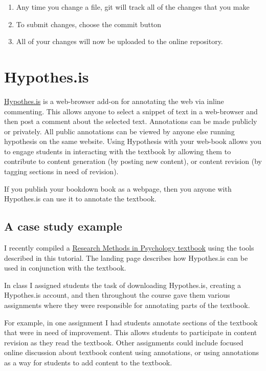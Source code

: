 \documentclass[
]{book}
\providecommand{\tightlist}{%
  \setlength{\itemsep}{0pt}\setlength{\parskip}{0pt}}
\begin{document}
\begin{enumerate}
\def\labelenumi{\arabic{enumi}.}
\tightlist
\item
  Any time you change a file, git will track all of the changes that you make
\item
  To submit changes, choose the commit button
\item
  All of your changes will now be uploaded to the online repository.
\end{enumerate}

\hypertarget{hypothes.is}{%
\chapter{Hypothes.is}\label{hypothes.is}}

\href{https://web.hypothes.is}{Hypothes.is} is a web-browser add-on for annotating the web via inline commenting. This allows anyone to select a snippet of text in a web-browser and then post a comment about the selected text. Annotations can be made publicly or privately. All public annotations can be viewed by anyone else running hypothesis on the same website. Using Hypothesis with your web-book allows you to engage students in interacting with the textbook by allowing them to contribute to content generation (by posting new content), or content revision (by tagging sections in need of revision).

If you publish your bookdown book as a webpage, then you anyone with Hypothes.is can use it to annotate the textbook.

\hypertarget{a-case-study-example}{%
\section{A case study example}\label{a-case-study-example}}

I recently compiled a \href{http://crumplab.github.io/ResearchMethods/}{Research Methods in Psychology textbook} using the tools described in this tutorial. The landing page describes how Hypothes.is can be used in conjunction with the textbook.

In class I assigned students the task of downloading Hypothes.is, creating a Hypothes.is account, and then throughout the course gave them various assignments where they were responsible for annotating parts of the textbook.

For example, in one assignment I had students annotate sections of the textbook that were in need of improvement. This allows students to participate in content revision as they read the textbook. Other assignments could include focused online discussion about textbook content using annotations, or using annotations as a way for students to add content to the textbook.
\end{document}
